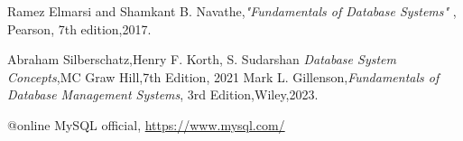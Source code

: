 \begin{thebibliography}{99}
	 Ramez Elmarsi and Shamkant B. Navathe,\emph{"Fundamentals of Database Systems"} , Pearson, 7th edition,2017. 
	
	 Abraham Silberschatz,Henry F. Korth, S. Sudarshan \emph{Database System Concepts},MC Graw Hill,7th Edition, 2021
	 Mark L. Gillenson,\emph{Fundamentals of Database Management Systems}, 3rd Edition,Wiley,2023.
	
	@online{ MySQL official},	\url{https://www.mysql.com/} 
\end{thebibliography}



